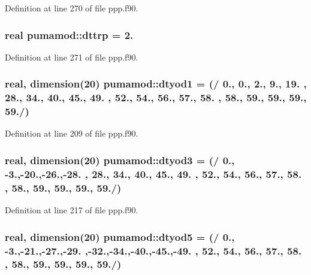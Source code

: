 \-Definition at line 270 of file ppp.\-f90.

\hypertarget{classpumamod_ac02146e243330a0df79fb4657d748ef4}{
\subsubsection[{dttrp}]{\setlength{\rightskip}{0pt plus 5cm}real {\bf pumamod\-::dttrp} = 2.}}
\label{classpumamod_ac02146e243330a0df79fb4657d748ef4}


\-Definition at line 271 of file ppp.\-f90.

\hypertarget{classpumamod_a01f849a7ffd4d78c73588a15edbc3527}{
\subsubsection[{dtyod1}]{\setlength{\rightskip}{0pt plus 5cm}real, dimension(20) {\bf pumamod\-::dtyod1} = (/ 0., 0., 2., 9., 19. , 28., 34., 40., 45., 49. , 52., 54., 56., 57., 58. , 58., 59., 59., 59., 59./)}}
\label{classpumamod_a01f849a7ffd4d78c73588a15edbc3527}


\-Definition at line 209 of file ppp.\-f90.

\hypertarget{classpumamod_a0f35364ab66cbd60fdedebdd3c776eee}{
\subsubsection[{dtyod3}]{\setlength{\rightskip}{0pt plus 5cm}real, dimension(20) {\bf pumamod\-::dtyod3} = (/ 0., -\/3.,-\/20.,-\/26.,-\/28. , 28., 34., 40., 45., 49. , 52., 54., 56., 57., 58. , 58., 59., 59., 59., 59./)}}
\label{classpumamod_a0f35364ab66cbd60fdedebdd3c776eee}


\-Definition at line 217 of file ppp.\-f90.

\hypertarget{classpumamod_ac054354166003ed7452262a59c8edf70}{
\subsubsection[{dtyod5}]{\setlength{\rightskip}{0pt plus 5cm}real, dimension(20) {\bf pumamod\-::dtyod5} = (/ 0., -\/3.,-\/21.,-\/27.,-\/29. ,-\/32.,-\/34.,-\/40.,-\/45.,-\/49. , 52., 54., 56., 57., 58. , 58., 59., 59., 59., 59./)}}
\label{classpumamod_ac054354166003ed7452262a59c8edf70}


